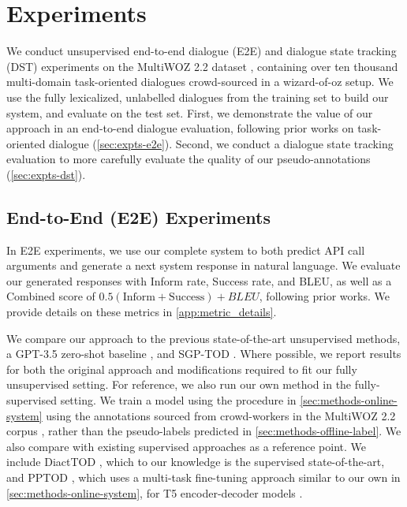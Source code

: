 \documentclass[11pt]{article}
\begin{document}
\section{Experiments}

We conduct unsupervised end-to-end dialogue (E2E) and dialogue state tracking (DST) experiments on the MultiWOZ 2.2 dataset \cite{zang_multiwoz_2020, budzianowski2018large}, containing over ten thousand multi-domain task-oriented dialogues crowd-sourced in a wizard-of-oz setup. We use the fully lexicalized, unlabelled dialogues from the training set to build our system, and evaluate on the test set.
First, we demonstrate the value of our approach in an end-to-end dialogue evaluation, following prior works on task-oriented dialogue (\autoref{sec:expts-e2e}). 
Second, we conduct a dialogue state tracking evaluation to more carefully evaluate the quality of our pseudo-annotations (\autoref{sec:expts-dst}).

\subsection{End-to-End (E2E) Experiments}
\label{sec:expts-e2e}

In E2E experiments, we use our complete system to both predict API call arguments and generate a next system response in natural language. 
We evaluate our generated responses with Inform rate, Success rate, and BLEU, as well as a Combined score of $0.5(\text{Inform} + \text{Success}) + BLEU$, following prior works. We provide details on these metrics in \autoref{app:metric_details}.

We compare our approach to the previous state-of-the-art unsupervised methods, a GPT-3.5 zero-shot baseline \cite{hudecek-dusek-2023-large}, and SGP-TOD \cite{zhang-etal-2023-sgp}. 
Where possible, we report results for both the original approach and modifications required to fit our fully unsupervised setting.
For reference, we also run our own method in the fully-supervised setting. 
We train a model using the procedure in \autoref{sec:methods-online-system} using the annotations sourced from crowd-workers in the MultiWOZ 2.2 corpus \cite{budzianowski2018large, zang_multiwoz_2020}, rather than the pseudo-labels predicted in \autoref{sec:methods-offline-label}.
We also compare with existing supervised approaches as a reference point. 
We include DiactTOD \cite{wu-etal-2023-diacttod}, which to our knowledge is the supervised state-of-the-art, and PPTOD \cite{su-etal-2022-multi}, which uses a multi-task fine-tuning approach similar to our own in \autoref{sec:methods-online-system}, for T5 encoder-decoder models \cite{raffel_exploring_2020}.
\end{document}
